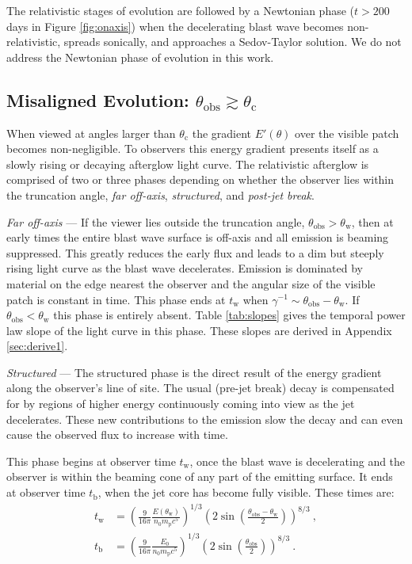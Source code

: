 \documentclass[twocolumn]{aastex62}
\newcommand{\tW}{\ensuremath{t_{\mathrm{w}}}}
\newcommand{\tb}{\ensuremath{t_{\mathrm{b}}}}
\newcommand{\thobs}{\ensuremath{\theta_{\mathrm{obs}}}}
\newcommand{\thW}{\ensuremath{\theta_{\mathrm{w}}}}
\newcommand{\thC}{\ensuremath{\theta_{\mathrm{c}}}}
\newcommand{\Mp}{\ensuremath{m_{\mathrm{p}}}}
\begin{document}
The relativistic stages of evolution are followed by a Newtonian phase ($t > 200$ days in Figure \ref{fig:onaxis}) when the decelerating blast wave becomes non-relativistic, spreads sonically, and approaches a Sedov-Taylor solution.  We do not address the Newtonian phase of evolution in this work.

\subsection{Misaligned Evolution: $\thobs \gtrsim \thC$} \label{subsec:misaligned}

When viewed at angles larger than $\thC$ the gradient $E'(\theta)$ over the visible patch becomes non-negligible.  To observers this energy gradient presents itself as a slowly rising or decaying afterglow light curve. The relativistic afterglow is comprised of two or three phases depending on whether the observer lies within the truncation angle, \emph{far off-axis}, \emph{structured}, and \emph{post-jet break}.

\emph{Far off-axis} --- If the viewer lies outside the truncation angle, $\thobs > \thW$, then at early times the entire blast wave surface is off-axis and all emission is beaming suppressed.  This greatly reduces the early flux and leads to a dim but steeply rising light curve as the blast wave decelerates.  Emission is dominated by material on the edge nearest the observer and the angular size of the visible patch is constant in time.  This phase ends at $\tW$ when $\gamma^{-1} \sim \thobs-\thW$.  If $\thobs < \thW$ this phase is entirely absent.  Table \ref{tab:slopes} gives the temporal power law slope of the light curve in this phase.  These slopes are derived in Appendix \ref{sec:derive1}.

\emph{Structured} --- The structured phase is the direct result of the energy gradient along the observer's line of site.  The usual (pre-jet break) decay is compensated for by regions of higher energy continuously coming into view as the jet decelerates.  These new contributions to the emission slow the decay and can even cause the observed flux to increase with time.

 This phase begins at observer time $\tW$, once the blast wave is decelerating and the observer is within the beaming cone of any part of the emitting surface.  It ends at observer time $\tb$, when the jet core has become fully visible.  These times are:
\begin{align}
	\tW &= \left(\frac{9}{16\pi} \frac{E(\thW)}{n_0 \Mp c^5}\right)^{1/3} \left( 2 \sin \left(\frac{\thobs-\thW}{2}\right)\right)^{8/3} \ ,\label{eq:tw} \\
	\tb &= \left(\frac{9}{16\pi} \frac{E_0}{n_0 \Mp c^5}\right)^{1/3} \left( 2 \sin \left(\frac{\thobs}{2}\right)\right)^{8/3} \ .\label{eq:tb}
\end{align}
\end{document}
